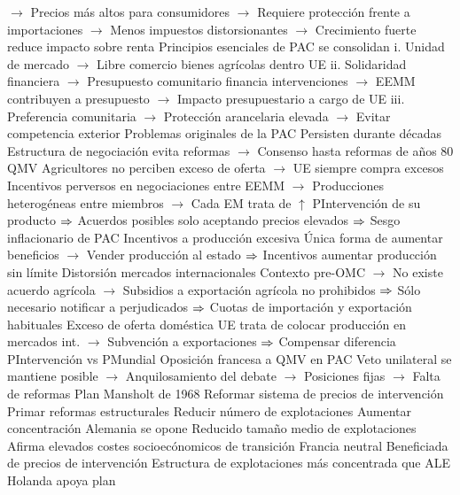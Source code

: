 \documentclass{nuevotema}
\begin{document}
\begin{esquemal}
				\4[] $\to$ Precios más altos para consumidores
				\4[] $\to$ Requiere protección frente a importaciones
				\4[] $\to$ Menos impuestos distorsionantes
				\4[] $\to$ Crecimiento fuerte reduce impacto sobre renta
				\4 Principios esenciales de PAC se consolidan
				\4[] i. Unidad de mercado
				\4[] $\to$ Libre comercio bienes agrícolas dentro UE
				\4[] ii. Solidaridad financiera
				\4[] $\to$ Presupuesto comunitario financia intervenciones
				\4[] $\to$ EEMM contribuyen a presupuesto
				\4[] $\to$ Impacto presupuestario a cargo de UE
				\4[] iii. Preferencia comunitaria
				\4[] $\to$ Protección arancelaria elevada
				\4[] $\to$ Evitar competencia exterior
				\4 Problemas originales de la PAC
				\4[] Persisten durante décadas
				\4[] Estructura de negociación evita reformas
				\4[] $\to$ Consenso hasta reformas de años 80 QMV
				\4[] Agricultores no perciben exceso de oferta
				\4[] $\to$ UE siempre compra excesos
				\4[] Incentivos perversos en negociaciones entre EEMM
				\4[] $\to$ Producciones heterogéneas entre miembros
				\4[] $\to$ Cada EM trata de $\uparrow$ PIntervención de su producto
				\4[] $\then$ Acuerdos posibles solo aceptando precios elevados
				\4[] $\then$ Sesgo inflacionario de PAC
				\4 Incentivos a producción excesiva
				\4[] Única forma de aumentar beneficios
				\4[] $\to$ Vender producción al estado
				\4[] $\then$ Incentivos aumentar producción sin límite
				\4 Distorsión mercados internacionales
				\4[] Contexto pre-OMC
				\4[] $\to$ No existe acuerdo agrícola
				\4[] $\to$ Subsidios a exportación agrícola no prohibidos
				\4[] $\then$ Sólo necesario notificar a perjudicados
				\4[] $\then$ Cuotas de importación y exportación habituales
				\4[] Exceso de oferta doméstica
				\4[] UE trata de colocar producción en mercados int.
				\4[] $\to$ Subvención a exportaciones
				\4[] $\then$ Compensar diferencia PIntervención vs PMundial
				\4 Oposición francesa a QMV en PAC
				\4[] Veto unilateral se mantiene posible
				\4[] $\to$ Anquilosamiento del debate
				\4[] $\to$ Posiciones fijas
				\4[] $\to$ Falta de reformas
				\4 Plan Mansholt de 1968
				\4[] Reformar sistema de precios de intervención
				\4[] Primar reformas estructurales
				\4[] Reducir número de explotaciones
				\4[] Aumentar concentración
				\4[$\then$] Alemania se opone
				\4[] Reducido tamaño medio de explotaciones
				\4[] Afirma elevados costes socioecónomicos de transición
				\4[$\then$] Francia neutral
				\4[] Beneficiada de precios de intervención
				\4[] Estructura de explotaciones más concentrada que ALE
				\4[$\then$] Holanda apoya plan

\end{esquemal}
\end{document}
